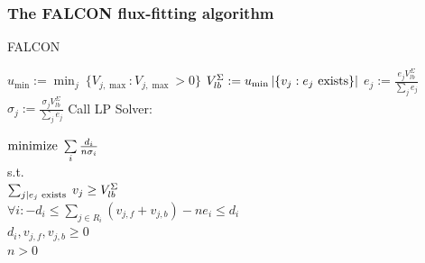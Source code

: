 \documentclass[compress]{beamer}
\begin{document}
\begin{frame}[fragile]
\frametitle{The FALCON flux-fitting algorithm}

\begin{algorithm}[H]
\tiny
\caption{FALCON}
\label{alg:FALCON}
\begin{algorithmic}
\State $u_{\min} := \min_j\ \{V_{j,\max} : V_{j,\max} > 0\}$
\State $V_{lb}^{\Sigma} := u_{\min} \left|\{v_j : e_j \textnormal{ exists}\}\right|$
  \State $e_j := \frac{e_j V_{lb}^{\Sigma}}
    {\sum\limits_{j} e_j}$ 
  \State $\sigma_j := \frac{\sigma_j V_{lb}^{\Sigma}}
    {\sum\limits_{j} e_j}$
\EndFor
{}
  \State Call LP Solver:
  \State \hspace{4.8mm} \parbox[t]{\dimexpr\linewidth-\algorithmicindent}{
    $\textnormal{minimize}\ \sum\limits_i \frac{d_i}{n \sigma_i}$\\
    s.t.\\
    $\sum_{j \mid e_j \textnormal{ exists }} v_j \geq V_{lb}^{\Sigma}$\\ 
    $\forall i: -d_i \leq \sum\nolimits_{j \in R_i} (v_{j,f} +
    v_{j,b}) - n e_i \leq d_i$\\ 
    $d_i, v_{j,f}, v_{j,b} \geq 0$\\ 
    $n > 0$
    \strut}
  \EndFor
\EndWhile
\end{algorithmic}
\end{algorithm}

\end{frame}

\end{document}
